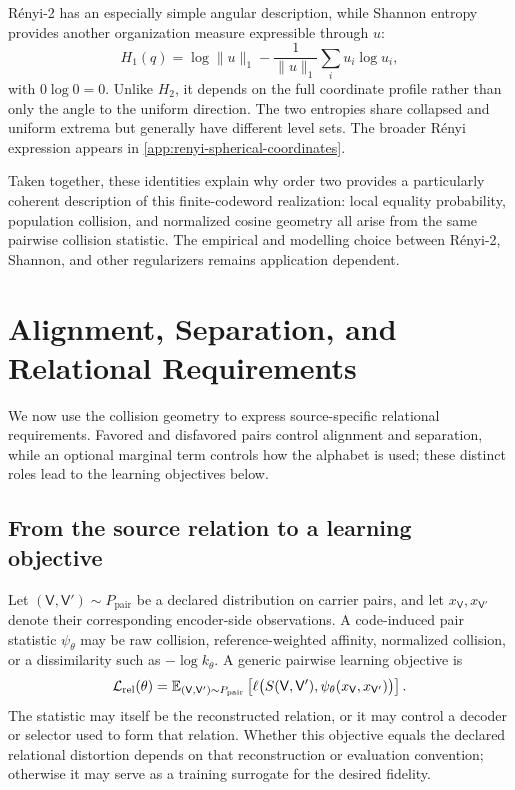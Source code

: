 R\'enyi-2 has an especially simple angular description, while Shannon entropy provides another organization measure expressible through $u$:
\begin{equation}
H_1(q)=\log\|u\|_1
-\frac{1}{\|u\|_1}\sum_i u_i\log u_i,
\label{eq:shannon-spherical}
\end{equation}
with $0\log0=0$.
Unlike $H_2$, it depends on the full coordinate profile rather than only the angle to the uniform direction.
The two entropies share collapsed and uniform extrema but generally have different level sets.
The broader R\'enyi expression appears in \ref{app:renyi-spherical-coordinates}.

Taken together, these identities explain why order two provides a particularly coherent description of this finite-codeword realization: local equality probability, population collision, and normalized cosine geometry all arise from the same pairwise collision statistic.
The empirical and modelling choice between R\'enyi-2, Shannon, and other regularizers remains application dependent.

\section{Alignment, Separation, and Relational Requirements}
\label{sec:alignment-separation}

We now use the collision geometry to express source-specific relational requirements.
Favored and disfavored pairs control alignment and separation, while an optional marginal term controls how the alphabet is used; these distinct roles lead to the learning objectives below.

\subsection{From the source relation to a learning objective}

Let $(\mathsf V,\mathsf V')\sim P_{\mathrm{pair}}$ be a declared distribution on carrier pairs, and let $x_{\mathsf V},x_{\mathsf V'}$ denote their corresponding encoder-side observations.
A code-induced pair statistic $\psi_\theta$ may be raw collision, reference-weighted affinity, normalized collision, or a dissimilarity such as $-\log k_\theta$.
A generic pairwise learning objective is
\begin{equation}
\mathcal L_{\mathrm{rel}}(\theta)
=\mathbb{E}_{(\mathsf V,\mathsf V')\sim P_{\mathrm{pair}}}\left[\ell\bigl(S(\mathsf V,\mathsf V'),\psi_\theta(x_{\mathsf V},x_{\mathsf V'})\bigr)\right].
\label{eq:generic-relational-objective}
\end{equation}
The statistic may itself be the reconstructed relation, or it may control a decoder or selector used to form that relation.
Whether this objective equals the declared relational distortion depends on that reconstruction or evaluation convention; otherwise it may serve as a training surrogate for the desired fidelity.

